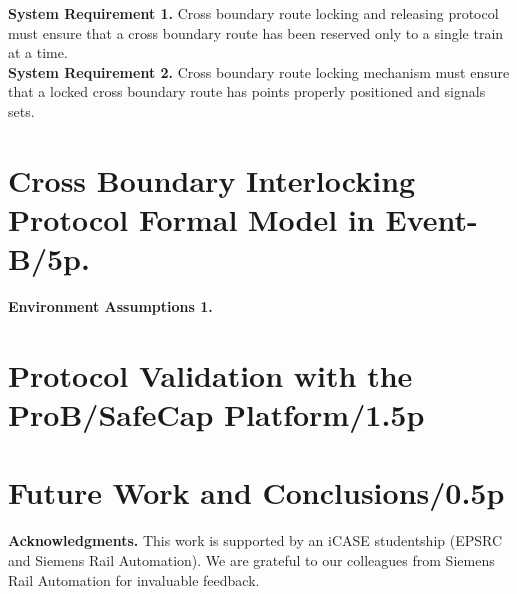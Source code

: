 \documentclass{llncs}
\newcommand{\yslant}{0.5}
\newcommand{\xslant}{-0.6}
\begin{document}


\noindent \textbf{System Requirement 1.} Cross boundary route locking and releasing protocol must ensure that a cross boundary route has been reserved only to a single train at a time. \\

\noindent \textbf{System Requirement 2.} Cross boundary route locking mechanism must ensure that a locked cross boundary route has points properly positioned and signals sets.

\newpage
\section{Cross Boundary Interlocking Protocol Formal Model in Event-B/5p.}


\noindent \textbf{Environment Assumptions 1.}






\newpage
\section{Protocol Validation with the ProB/SafeCap Platform/1.5p}

\newpage
\section{Future Work and Conclusions/0.5p}

\noindent \textbf{Acknowledgments.} This work is supported by an iCASE studentship (EPSRC and Siemens Rail Automation). We are grateful to our colleagues from Siemens Rail Automation for invaluable feedback.




\end{document}
